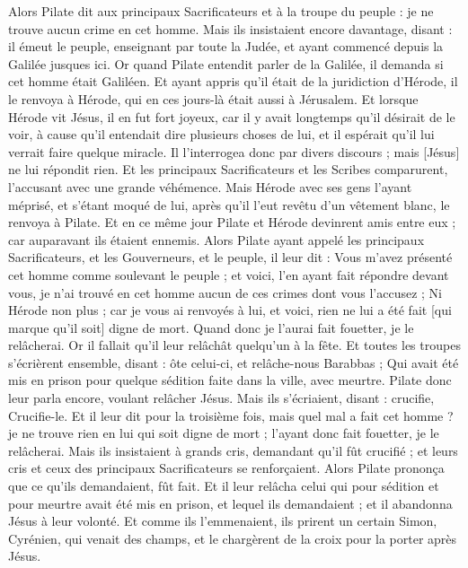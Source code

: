 \begin{multicols}{2}
Alors Pilate dit aux principaux Sacrificateurs et à la troupe du peuple : je ne trouve aucun crime en cet homme.
Mais ils insistaient encore davantage, disant : il émeut le peuple, enseignant par toute la Judée, et ayant commencé depuis la Galilée jusques ici.
Or quand Pilate entendit parler de la Galilée, il demanda si cet homme était Galiléen.
Et ayant appris qu'il était de la juridiction d'Hérode, il le renvoya à Hérode, qui en ces jours-là était aussi à Jérusalem.
Et lorsque Hérode vit Jésus, il en fut fort joyeux, car il y avait longtemps qu'il désirait de le voir, à cause qu'il entendait dire plusieurs choses de lui, et il espérait qu'il lui verrait faire quelque miracle.
Il l'interrogea donc par divers discours ; mais [Jésus] ne lui répondit rien.
Et les principaux Sacrificateurs et les Scribes comparurent, l'accusant avec une grande véhémence.
Mais Hérode avec ses gens l'ayant méprisé, et s'étant moqué de lui, après qu'il l'eut revêtu d'un vêtement blanc, le renvoya à Pilate.
Et en ce même jour Pilate et Hérode devinrent amis entre eux ; car auparavant ils étaient ennemis.
Alors Pilate ayant appelé les principaux Sacrificateurs, et les Gouverneurs, et le peuple, il leur dit :
Vous m'avez présenté cet homme comme soulevant le peuple ; et voici, l'en ayant fait répondre devant vous, je n'ai trouvé en cet homme aucun de ces crimes dont vous l'accusez ;
Ni Hérode non plus ; car je vous ai renvoyés à lui, et voici, rien ne lui a été fait [qui marque qu'il soit] digne de mort.
Quand donc je l'aurai fait fouetter, je le relâcherai.
Or il fallait qu'il leur relâchât quelqu'un à la fête.
Et toutes les troupes s'écrièrent ensemble, disant : ôte celui-ci, et relâche-nous Barabbas ;
Qui avait été mis en prison pour quelque sédition faite dans la ville, avec meurtre.
Pilate donc leur parla encore, voulant relâcher Jésus.
Mais ils s'écriaient, disant : crucifie, Crucifie-le.
Et il leur dit pour la troisième fois, mais quel mal a fait cet homme ? je ne trouve rien en lui qui soit digne de mort ; l'ayant donc fait fouetter, je le relâcherai.
Mais ils insistaient à grands cris, demandant qu'il fût crucifié ; et leurs cris et ceux des principaux Sacrificateurs se renforçaient.
Alors Pilate prononça que ce qu'ils demandaient, fût fait.
Et il leur relâcha celui qui pour sédition et pour meurtre avait été mis en prison, et lequel ils demandaient ; et il abandonna Jésus à leur volonté.
Et comme ils l'emmenaient, ils prirent un certain Simon, Cyrénien, qui venait des champs, et le chargèrent de la croix pour la porter après Jésus.

\end{multicols}
